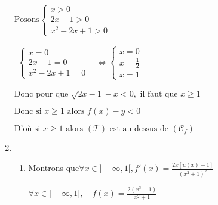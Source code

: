 \documentclass[12pt,a4paper]{article}
\begin{document}
\begin{enumerate}
          \(
          \text{Posons}
          \begin{cases}
              x > 0      \\
              2x - 1 > 0 \\
              x^2 - 2x + 1>0
          \end{cases}
          \)

          \(
          \begin{aligned}
              \begin{cases}
                  x = 0      \\
                  2x - 1 = 0 \\
                  x^2 - 2x + 1 = 0
              \end{cases}
               & \Leftrightarrow
              \begin{cases}
                  x = 0         \\
                  x=\frac{1}{2} \\
                  x = 1
              \end{cases}
          \end{aligned}
          \)


          \(
          \text{Donc pour que } \sqrt{2x - 1} - x < 0, \text{ il faut que } x \geq 1
          \)

          \(
          \text{Donc si } x \geq 1 \text{ alors } f(x) - y < 0
          \)

          \(
          \text{D'où si } x \geq 1 \text{ alors } (\mathcal{T}) \text{ est au-dessus de } (\mathcal{C}_f)
          \)

    \item
          \begin{enumerate}
              \item Montrons que\( \forall x \in ]-\infty,1[, f'(x) =   \frac{2x\left[u(x)-1\right]}{(x^2+1)^2}  \)

                    \(\forall x \in ]-\infty,1[, \quad f(x) = \frac{2(x^3+1)}{x^2+1}\)


\end{enumerate}
\end{enumerate}
\end{document}
